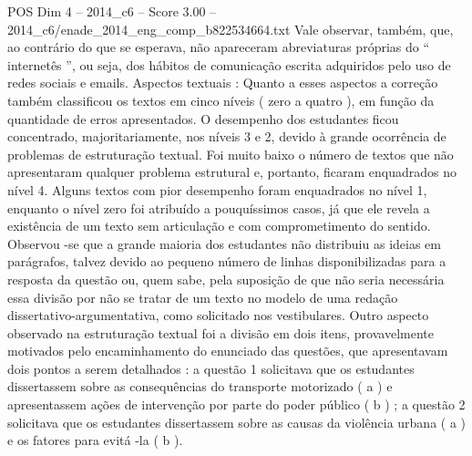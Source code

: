 \begin{textsample}{POS Dim 4 – 2014\_c6 – Score 3.00 – 2014\_c6/enade\_2014\_eng\_comp\_b822534664.txt}
Vale observar, também, que, ao contrário do que se esperava, não apareceram abreviaturas próprias do “ internetês ”, ou seja, dos hábitos de comunicação escrita adquiridos pelo uso de redes sociais e emails.
Aspectos textuais : Quanto a esses aspectos a correção também classificou os textos em cinco níveis ( zero a quatro ), em função da quantidade de erros apresentados.
O desempenho dos estudantes ficou concentrado, majoritariamente, nos níveis 3 e 2, devido à grande ocorrência de problemas de estruturação textual.
Foi muito baixo o número de textos que não apresentaram qualquer problema estrutural e, portanto, ficaram enquadrados no nível 4.
Alguns textos com pior desempenho foram enquadrados no nível 1, enquanto o nível zero foi atribuído a pouquíssimos casos, já que ele revela a existência de um texto sem articulação e com comprometimento do sentido.
Observou -se que a grande maioria dos estudantes não distribuiu as ideias em parágrafos, talvez devido ao pequeno número de linhas disponibilizadas para a resposta da questão ou, quem sabe, pela suposição de que não seria necessária essa divisão por não se tratar de um texto no modelo de uma redação dissertativo-argumentativa, como solicitado nos vestibulares.
Outro aspecto observado na estruturação textual foi a divisão em dois itens, provavelmente motivados pelo encaminhamento do enunciado das questões, que apresentavam dois pontos a serem detalhados : a questão 1 solicitava que os estudantes dissertassem sobre as consequências do transporte motorizado ( a ) e apresentassem ações de intervenção por parte do poder público ( b ) ; a questão 2 solicitava que os estudantes dissertassem sobre as causas da violência urbana ( a ) e os fatores para evitá -la ( b ).

\end{textsample}
